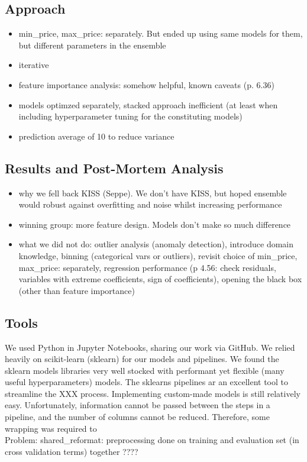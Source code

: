 \documentclass[a4paper,11pt]{article}
\begin{document}
\subsection{Approach}
\begin{itemize}
\item min\_price, max\_price: separately. But ended up using same models for them, but different parameters in the ensemble
\item iterative
\item feature importance analysis: somehow helpful, known caveats (p. 6.36)
\item models optimzed separately, stacked approach inefficient (at least when including hyperparameter tuning for the constituting models)
\item prediction average of 10 to reduce variance
\end{itemize}

\subsection{Results and Post-Mortem Analysis}
\begin{itemize}
\item why we fell back KISS (Seppe). We don't have KISS, but hoped ensemble would robust against overfitting and noise whilst increasing performance
\item winning group: more feature design. Models don't make so much difference
\item what we did not do: outlier analysis (anomaly detection), introduce domain knowledge, binning (categorical vars or outliers),  revisit choice of min\_price, max\_price: separately, regression performance (p 4.56: check residuals, variables with extreme coefficients, sign of coefficients), opening the black box (other than feature importance)
\end{itemize}

\subsection{Tools}
We used Python in Jupyter Notebooks, sharing our work via GitHub. We relied heavily on scikit-learn (sklearn) for our models and pipelines. We found  the sklearn models libraries very well stocked with performant yet flexible (many useful hyperparameters) models. The sklearns pipelines ar an excellent tool to streamline the XXX process. Implementing custom-made models is still relatively easy. Unfortunately, information cannot be passed between the steps in a pipeline, and the number of columns cannot be reduced. Therefore, some wrapping was required to\\
Problem: shared\_reformat: preprocessing done on training and evaluation set (in cross validation terms) together ????
\end{document}
